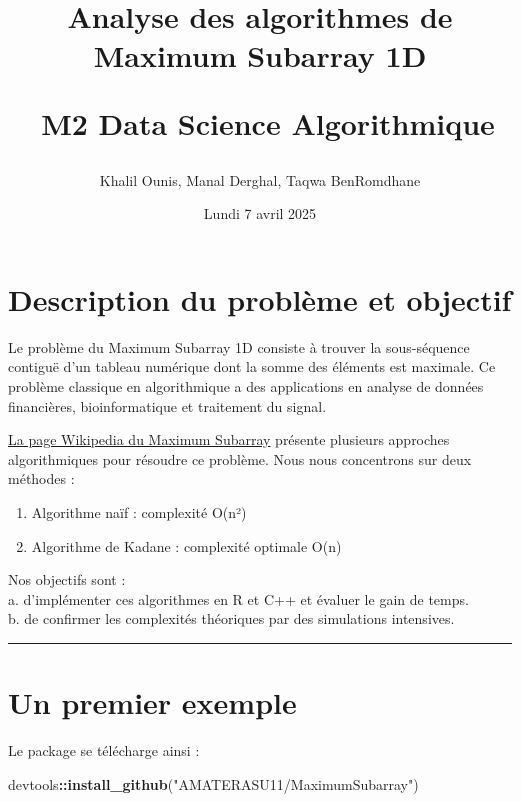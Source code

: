 \documentclass[
]{article}
\title{Analyse des algorithmes de Maximum Subarray 1D\\
\strut ~M2 Data Science Algorithmique}
\author{Khalil Ounis, Manal Derghal, Taqwa BenRomdhane}
\date{Lundi 7 avril 2025}
\newenvironment{Shaded}{\begin{snugshade}}{\end{snugshade}}
\newcommand{\FunctionTok}[1]{\textcolor[rgb]{0.13,0.29,0.53}{\textbf{#1}}}
\newcommand{\NormalTok}[1]{#1}
\newcommand{\SpecialCharTok}[1]{\textcolor[rgb]{0.81,0.36,0.00}{\textbf{#1}}}
\newcommand{\StringTok}[1]{\textcolor[rgb]{0.31,0.60,0.02}{#1}}
\providecommand{\tightlist}{%
  \setlength{\itemsep}{0pt}\setlength{\parskip}{0pt}}
\begin{document}
\maketitle

{
\hypersetup{linkcolor=}
\setcounter{tocdepth}{2}
\tableofcontents
}
\noindent\hrulefill

\section{Description du problème et
objectif}\label{description-du-probluxe8me-et-objectif}

Le problème du Maximum Subarray 1D consiste à trouver la sous-séquence
contiguë d'un tableau numérique dont la somme des éléments est maximale.
Ce problème classique en algorithmique a des applications en analyse de
données financières, bioinformatique et traitement du signal.

\href{https://en.wikipedia.org/wiki/Maximum_subarray_problem}{La page
Wikipedia du Maximum Subarray} présente plusieurs approches
algorithmiques pour résoudre ce problème. Nous nous concentrons sur deux
méthodes :

\begin{enumerate}
\def\labelenumi{\arabic{enumi}.}
\tightlist
\item
  Algorithme naïf : complexité O(n²)
\item
  Algorithme de Kadane : complexité optimale O(n)
\end{enumerate}

Nos objectifs sont :\\
a. d'implémenter ces algorithmes en R et C++ et évaluer le gain de
temps.\\
b. de confirmer les complexités théoriques par des simulations
intensives.

\begin{center}\rule{0.5\linewidth}{0.5pt}\end{center}

\section{Un premier exemple}\label{un-premier-exemple}

Le package se télécharge ainsi :

\begin{Shaded}
\begin{Highlighting}[]
\NormalTok{devtools}\SpecialCharTok{::}\FunctionTok{install\_github}\NormalTok{(}\StringTok{"AMATERASU11/MaximumSubarray"}\NormalTok{)}
\end{Highlighting}
\end{Shaded}
\end{document}
